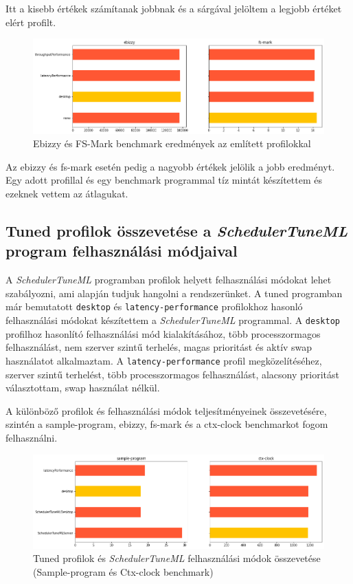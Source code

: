 Itt a kisebb értékek számítanak jobbnak és a sárgával jelöltem a legjobb értéket elért profilt.

\begin{figure}[h!]
\centering
\includegraphics[width=\textwidth]{images/ebizzyAndFsMark.png}
\caption{Ebizzy és FS-Mark benchmark eredmények az említett profilokkal}
\label{fig:tunedProfilesEbizzyAndFsmark}
\end{figure}

Az ebizzy és fs-mark esetén pedig a nagyobb értékek jelölik a jobb eredményt.
Egy adott profillal és egy benchmark programmal tíz mintát készítettem és ezeknek vettem az átlagukat.

\subsection{Tuned profilok összevetése a \textit{SchedulerTuneML} program felhasználási módjaival}

A \textit{SchedulerTuneML} programban profilok helyett felhasználási módokat lehet szabályozni, ami alapján tudjuk hangolni a rendszerünket. A tuned programban már bemutatott \texttt{desktop} és \texttt{latency-performance} profilokhoz hasonló felhasználási módokat készítettem a \textit{SchedulerTuneML} programmal. A \texttt{desktop} profilhoz hasonlító felhasználási mód kialakításához, több processzormagos felhasználást, nem szerver szintű terhelés, magas prioritást és aktív swap használatot alkalmaztam. A \texttt{latency-performance} profil megközelítéséhez, szerver szintű terhelést, több processzormagos felhasználást, alacsony prioritást választottam, swap használat nélkül.

A különböző profilok és felhasználási módok teljesítményeinek összevetésére, szintén a sample-program, ebizzy, fs-mark és a ctx-clock benchmarkot fogom felhasználni. 

\begin{figure}[h!]
\centering
\includegraphics[width=\textwidth]{images/tunedAndSchedulerTuneMLCompareSampleprogramCtxclock.png}
\caption{Tuned profilok és \textit{SchedulerTuneML} felhasználási módok összevetése (Sample-program és Ctx-clock benchmark)}
\label{fig:tunedProfilesComparedToSchedulerTuneMlSampleprogramAndCtxClock}
\end{figure}

